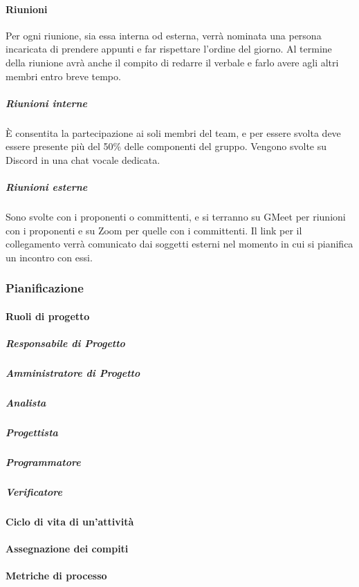 \paragraph{Riunioni}
Per ogni riunione, sia essa interna od esterna, verrà nominata una persona incaricata di prendere appunti e far rispettare l'ordine del giorno. Al termine della riunione avrà anche il compito di redarre il verbale e farlo avere agli altri membri entro breve tempo.
\subparagraph{Riunioni interne}
È consentita la partecipazione ai soli membri del team, e per essere svolta deve essere presente più del 50\% delle componenti del gruppo. Vengono svolte su Discord in una chat vocale dedicata.
\subparagraph{Riunioni esterne}
Sono svolte con i proponenti o committenti, e si terranno su GMeet per riunioni con i proponenti e su Zoom per quelle con i committenti. Il link per il collegamento verrà comunicato dai soggetti esterni nel momento in cui si pianifica un incontro con essi.
\subsubsection{Pianificazione}

\paragraph{Ruoli di progetto}
\subparagraph{Responsabile di Progetto}
\subparagraph{Amministratore di Progetto}
\subparagraph{Analista}
\subparagraph{Progettista}
\subparagraph{Programmatore}
\subparagraph{Verificatore}
\paragraph{Ciclo di vita di un'attività}
\paragraph{Assegnazione dei compiti}
\paragraph{Metriche di processo}